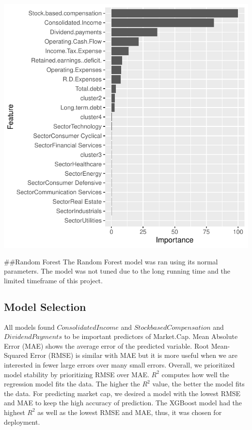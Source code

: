 \documentclass[11pt,]{article}
\begin{document}
\begin{center}\includegraphics{stock_analysis_files/figure-latex/gradient boosting-1} \end{center}

\#\#Random Forest The Random Forest model was ran using its normal
parameters. The model was not tuned due to the long running time and the
limited timeframe of this project.

\hypertarget{model-selection}{%
\subsection{Model Selection}\label{model-selection}}

All models found \(Consolidated Income\) and
\(Stock based Compensation\) and \(Dividend Payments\) to be important
predictors of Market.Cap. Mean Absolute Error (MAE) shows the average
error of the predicted variable. Root Mean-Squared Error (RMSE) is
similar with MAE but it is more useful when we are interested in fewer
large errors over many small errors. Overall, we prioritized model
stability by prioritizing RMSE over MAE. \(R^2\) computes how well the
regression model fits the data. The higher the \(R^2\) value, the better
the model fits the data. For predicting market cap, we desired a model
with the lowest RMSE and MAE to keep the high accuracy of prediction.
The XGBoost model had the highest \(R^2\) as well as the lowest RMSE and
MAE, thus, it was chosen for deployment.
\end{document}
